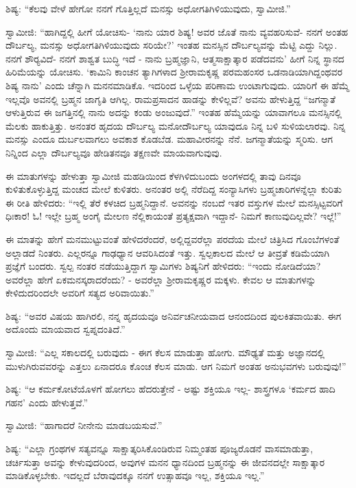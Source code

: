  ಶಿಷ್ಯ: “ಕೆಲವು ವೇಳೆ ಹೇಗೋ ನನಗೆ ಗೊತ್ತಿಲ್ಲದೆ ಮನಸ್ಸು ಅಧೋಗತಿಗಿಳಿಯುವುದು, ಸ್ವಾಮೀಜಿ.” 

 ಸ್ವಾಮೀಜಿ: “ಹಾಗಿದ್ದಲ್ಲಿ ಹೀಗೆ ಯೋಚಿಸು- ‘ನಾನು ಯಾರ ಶಿಷ್ಯ! ಅವರ ಜೊತೆ ನಾನು ವ್ಯವಹರಿಸುವೆ- ನನಗೆ ಅಂತಹ ದೌರ್ಬಲ್ಯ, ಮನಸ್ಸು ಅಧೋಗತಿಗಿಳಿಯುವುದು ಸರಿಯೇ?’ ಇಂತಹ ಮನಸ್ಸಿನ ದೌರ್ಬಲ್ಯವನ್ನು ಮೆಟ್ಟಿ ಎದ್ದು ನಿಲ್ಲು. ನನಗೆ ಶೌರ‍್ಯವಿದೆ- ನನಗೆ ಶಾಶ್ವತ ಬುದ್ಧಿ ಇದೆ - ನಾನು ಬ್ರಹ್ಮಜ್ಞಾನಿ, ಆತ್ಮಸಾಕ್ಷಾತ್ಕಾರ ಪಡೆದವನು’ ಹೀಗೆ ನಿನ್ನ ಸ್ಥಾನದ ಹಿರಿಮೆಯನ್ನು ಯೋಚಿಸು. ‘ಕಾಮಿನಿ ಕಾಂಚನ ತ್ಯಾಗಿಗಳಾದ ಶ‍್ರೀರಾಮಕೃಷ್ಣ ಪರಮಹಂಸರ ಒಡನಾಡಿಯಾಗಿದ್ದಂಥವರ ಶಿಷ್ಯ ನಾನು’ ಎಂದು ಚೆನ್ನಾಗಿ ಮನನಮಾಡಿಕೊ. ಇದರಿಂದ ಒಳ್ಳೆಯ ಪರಿಣಾಮ ಉಂಟಾಗುವುದು. ಯಾರಿಗೆ ಈ ಹೆಮ್ಮೆ ಇಲ್ಲವೊ ಅವನಲ್ಲಿ ಬ್ರಹ್ಮನ ಜಾಗೃತಿ ಆಗಿಲ್ಲ. ರಾಮಪ್ರಸಾದನ ಹಾಡನ್ನು ಕೇಳಿಲ್ಲವೆ? ಅವನು ಹೇಳುತ್ತಿದ್ದ “ಜಗನ್ಮಾತೆ ಆಳುತ್ತಿರುವ ಈ ಜಗತ್ತಿನಲ್ಲಿ ನಾನು ಅದನ್ನು ಕಂಡು ಅಂಜುವುದೆ.” ಇಂತಹ ಹೆಮ್ಮೆಯನ್ನು ಯಾವಾಗಲೂ ಮನಸ್ಸಿನಲ್ಲಿ ಮೆಲಕು ಹಾಕುತ್ತಿತ್ತು. ಅನಂತರ ಹೃದಯ ದೌರ್ಬಲ್ಯ ಮನೋದೌರ್ಬಲ್ಯ ಯಾವುದೂ ನಿನ್ನ ಬಳಿ ಸುಳಿಯಲಾರವು. ನಿನ್ನ ಮನಸ್ಸು ಎಂದೂ ದುರ್ಬಲವಾಗಲು ಅವಕಾಶ ಕೊಡಬೆಡ. ಮಹಾವೀರನನ್ನು ನೆನೆ. ಜಗನ್ಮಾತೆಯನ್ನು ಸ್ಮರಿಸು. ಆಗ ನಿನ್ನಿಂದ ಎಲ್ಲಾ ದೌರ್ಬಲ್ಯವೂ ಹೇಡಿತನವೂ ತಕ್ಷಣವೇ ಮಾಯವಾಗುವುವು. 

 ಈ ಮಾತುಗಳನ್ನು ಹೇಳುತ್ತಾ ಸ್ವಾಮೀಜಿ ಮಹಡಿಯಿಂದ ಕೆಳಗಿಳಿದುಬಂದು ಅಂಗಳದಲ್ಲಿ ತಾವು ದಿನವೂ ಕುಳಿತುಕೊಳ್ಳುತ್ತಿದ್ದ ಮಂಚದ ಮೇಲೆ ಕುಳಿತರು. ಅನಂತರ ಅಲ್ಲಿ ನೆರೆದಿದ್ದ ಸಂನ್ಯಾಸಿಗಳು ಬ್ರಹ್ಮಚಾರಿಗಳನ್ನೆಲ್ಲಾ ಕುರಿತು ಈ ರೀತಿ ಹೇಳಿದರು: “ಇಲ್ಲಿ ತೆರೆ ಕಳಚಿದ ಬ್ರಹ್ಮನಿದ್ದಾನೆ. ಅವನನ್ನು ನಂಬದೆ ಇತರ ವಸ್ತುಗಳ ಮೇಲೆ ಮನಸ್ಸಿಟ್ಟವರಿಗೆ ಧಿಃಕಾರ! ಓ! ಇಲ್ಲೇ ಬ್ರಹ್ಮ ಅಂಗೈ ಮೇಲಣ ನೆಲ್ಲಿಕಾಯಂತೆ ಪ್ರತ್ಯಕ್ಷವಾಗಿ ಇದ್ದಾನೆ- ನಿಮಗೆ ಕಾಣುವುದಿಲ್ಲವೇ? ಇಲ್ಲೆ!” 

 ಈ ಮಾತನ್ನು ಹೇಗೆ ಮನಮುಟ್ಟುವಂತೆ ಹೇಳಿದರೆಂದರೆ, ಅಲ್ಲಿದ್ದವರೆಲ್ಲಾ ಪರದೆಯ ಮೇಲೆ ಚಿತ್ರಿಸಿದ ಗೊಂಬೆಗಳಂತೆ ಅಲ್ಲಾಡದೆ ನಿಂತರು. ಎಲ್ಲರನ್ನೂ ಗಾಢಧ್ಯಾನ ಆವರಿಸಿದಂತೆ ಇತ್ತು. ಸ್ವಲ್ಪಕಾಲದ ಮೇಲೆ ಆ ತೀವ್ರತೆ ಕಡಿಮೆಯಾಗಿ ಪ್ರಜ್ಞೆಗೆ ಬಂದರು. ಸ್ವಲ್ಪ ನಂತರ ನಡೆಯುತ್ತಿದ್ದಾಗ ಸ್ವಾಮಿಗಳು ಶಿಷ್ಯನಿಗೆ ಹೇಳಿದರು: “ಇಂದು ನೋಡಿದೆಯಾ? ಅವರೆಲ್ಲಾ ಹೇಗೆ ಏಕಮನಸ್ಕರಾದರೆಂದು? - ಅವರೆಲ್ಲಾ ಶ‍್ರೀರಾಮಕೃಷ್ಣರ ಮಕ್ಕಳು. ಕೇವಲ ಆ ಮಾತುಗಳನ್ನು ಕೇಳಿದುದರಿಂದಲೇ ಅವರಿಗೆ ಸತ್ಯದ ಅರಿವಾಯಿತು.” 

 ಶಿಷ್ಯ: “ಅವರ ವಿಷಯ ಹಾಗಿರಲಿ, ನನ್ನ ಹೃದಯವೂ ಅನಿರ್ವಚನೀಯವಾದ ಆನಂದದಿಂದ ಪುಲಕಿತವಾಯಿತು. ಈಗ ಅದೊಂದು ಮಾಯವಾದ ಸ್ವಪ್ನದಂತಿದೆ.” 

 ಸ್ವಾಮೀಜಿ: “ಎಲ್ಲ ಸಕಾಲದಲ್ಲಿ ಬರುವುದು - ಈಗ ಕೆಲಸ ಮಾಡುತ್ತಾ ಹೋಗು. ಮೌಢ್ಯತೆ ಮತ್ತು ಅಜ್ಞಾನದಲ್ಲಿ ಮುಳುಗಿರುವವರನ್ನು ಎತ್ತಲು ಏನಾದರೂ ಕೊಂಚ ಕೆಲಸ ಮಾಡು. ಆಗ ನಿಮಗೆ ಅಂತಹ ಅನುಭವಗಳು ಬರುವುವು!” 

 ಶಿಷ್ಯ: “ಆ ಕರ್ಮಕೋಟೆಯೊಳಗೆ ಹೋಗಲು ಹೆದರುತ್ತೇನೆ - ಅಷ್ಟು ಶಕ್ತಿಯೂ ಇಲ್ಲ- ಶಾಸ್ತ್ರಗಳೂ ‘ಕರ್ಮದ ಹಾದಿ ಗಹನ’ ಎಂದು ಹೇಳುತ್ತವೆ.” 

 ಸ್ವಾಮೀಜಿ: “ಹಾಗಾದರೆ ನೀನೇನು ಮಾಡಬಯಸುವೆ.” 

 ಶಿಷ್ಯ: “ಎಲ್ಲಾ ಗ್ರಂಥಗಳ ಸತ್ಯವನ್ನೂ ಸಾಕ್ಷಾತ್ಕರಿಸಿಕೊಂಡಿರುವ ನಿಮ್ಮಂತಹ ಪೂಜ್ಯರೊಡನೆ ವಾಸಮಾಡುತ್ತಾ, ಚರ್ಚಿಸುತ್ತಾ ಅವನ್ನು ಕೇಳುವುದರಿಂದ, ಅವುಗಳ ಮನನ ಧ್ಯಾನದಿಂದ ಬ್ರಹ್ಮನನ್ನು ಈ ಜೀವನದಲ್ಲೇ ಸಾಕ್ಷಾತ್ಕಾರ ಮಾಡಿಕೊಳ್ಳಬೇಕು. ಇದಲ್ಲದೆ ಬೆರಾವುದಕ್ಕೂ ನನಗೆ ಉತ್ಸಾಹವೂ ಇಲ್ಲ, ಶಕ್ತಿಯೂ ಇಲ್ಲ.” 


